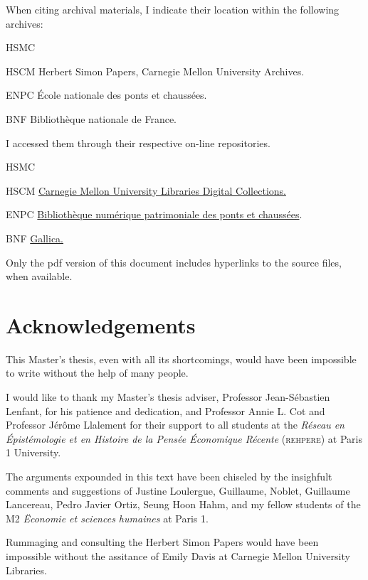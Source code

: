 \documentclass[version=last,draft=true,paper=A4,portrait,twoside=true,twocolumn=false,headinclude=false,footinclude=false,fontsize=12,BCOR=20mm,DIV=calc,pagesize=auto,titlepage=firstiscover,mpinclude=true,open=right,chapterprefix=true,numbers=autoendperiod,headsepline=false,headings=twolinechapter,parskip=false]{scrbook}
\begin{document}
When citing archival materials, I indicate their location within the
following archives:

\begin{labeling}[:]{HSMC} 
\item[HSCM] Herbert Simon Papers, Carnegie Mellon University Archives.
\item[ENPC] École nationale des ponts et chaussées.
\item[BNF] Bibliothèque nationale de France. 
\end{labeling}

I accessed them through their respective on-line repositories.

\begin{labeling}[:]{HSMC} 
\item[HSCM] \href{https://digitalcollections.library.cmu.edu/portal/index.jsp}{Carnegie Mellon University Libraries Digital Collections.} 
\item[ENPC] \href{https://patrimoine.enpc.fr/}{Bibliothèque numérique patrimoniale des ponts et chaussées}.
\item[BNF] \href{https://gallica.bnf.fr/}{Gallica.}
\end{labeling}

Only the pdf version of this document includes hyperlinks to the source
files, when available.

\chapter{Acknowledgements} 
This Master's thesis, even with all its shortcomings, would have been
impossible to write without the help of many people.

I would like to thank my Master's thesis adviser, Professor Jean-Sébastien
Lenfant, for his patience and dedication, and Professor Annie L. Cot and
Professor Jérôme Llalement for their support to all students at the
\textit{Réseau en Épistémologie et en Histoire de la Pensée Économique
  Récente} (\textsc{rehpere}) at Paris 1 University.

The arguments expounded in this text have been chiseled by the insighfult
comments and suggestions of Justine Loulergue, Guillaume, Noblet, Guillaume
Lancereau, Pedro Javier Ortiz, Seung Hoon Hahm, and my fellow students of
the M2 \textit{Ëconomie et sciences humaines} at Paris 1.

Rummaging and consulting the Herbert Simon Papers would have been
impossible without the assitance of Emily Davis at Carnegie Mellon
University Libraries.
\end{document}
